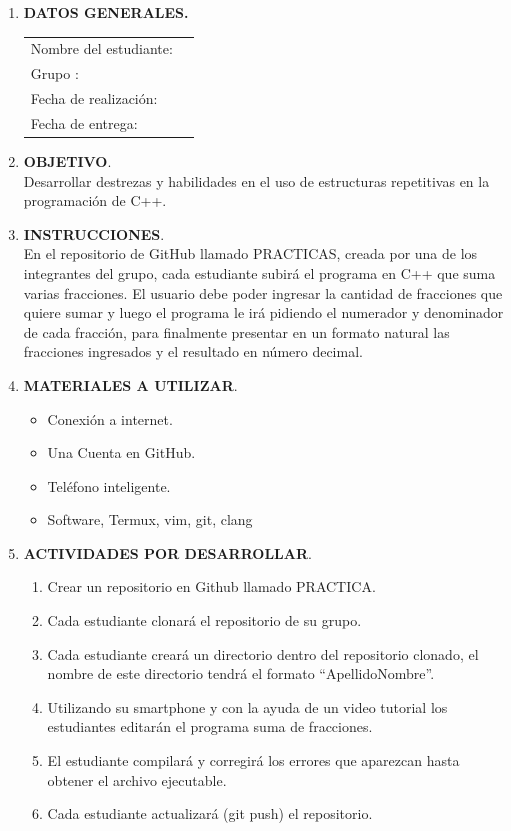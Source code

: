 \documentclass[a4paper,12pt,spanish]{article}
\begin{document}
\begin{enumerate}
\item \textbf{DATOS GENERALES.}

\begin{tabular}[H]{lp{10cm}}
  Nombre del estudiante: & \hrulefill  \\
  Grupo : & \hrulefill  \\
  Fecha de realización: & \hrulefill  \\
  Fecha de entrega: &  \hrulefill  \\
  

  
\end{tabular}

  \item \textbf{OBJETIVO}.\\
  Desarrollar destrezas y habilidades en el uso de estructuras repetitivas en la programación de C++.

  \item \textbf{INSTRUCCIONES}.\\
  En el repositorio de GitHub llamado PRACTICAS, creada por una de los integrantes del grupo, cada estudiante subirá el programa en C++ que suma varias fracciones. El usuario debe poder ingresar la cantidad de fracciones que quiere sumar y luego el programa le irá pidiendo el numerador y denominador de cada fracción, para finalmente presentar en un formato natural las fracciones ingresados y el resultado en número decimal.
  \item \textbf{MATERIALES A UTILIZAR}.\\
    \begin{itemize}
    \item Conexión a internet.
    \item Una Cuenta en GitHub.
    \item Teléfono inteligente.
    \item Software, Termux, vim, git, clang
    \end{itemize}
  \item \textbf{ACTIVIDADES POR DESARROLLAR}.\\
    \begin{enumerate}
    \item Crear un repositorio en Github llamado PRACTICA.
    \item Cada estudiante clonará el repositorio de su grupo.
    \item Cada estudiante creará un directorio dentro del repositorio clonado, el nombre de este directorio tendrá el formato ``ApellidoNombre''.
    \item Utilizando su smartphone y con la ayuda de un video tutorial los estudiantes editarán el programa suma de fracciones.
    \item El estudiante compilará y corregirá los errores que aparezcan hasta obtener el archivo ejecutable.
    \item Cada estudiante actualizará (git push) el repositorio.
    \end{enumerate}
  

\end{enumerate}
\end{document}
